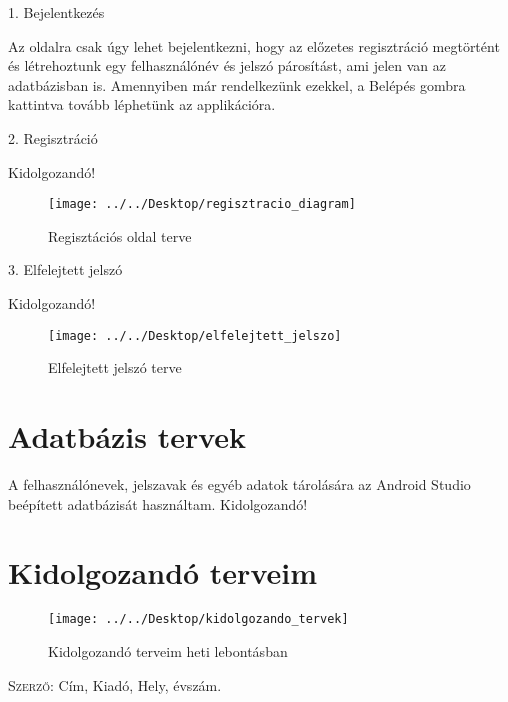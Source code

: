 \documentclass{thesis-ekf}
\begin{document}
	\begin{flushleft}
		1. Bejelentkezés
	\end{flushleft}

	Az oldalra csak úgy lehet bejelentkezni, hogy az előzetes regisztráció megtörtént és létrehoztunk egy felhasználónév és jelszó párosítást, ami jelen van az adatbázisban is. Amennyiben már rendelkezünk ezekkel, a Belépés gombra kattintva tovább léphetünk az applikációra.
	
	\begin{flushleft}
		2. Regisztráció
	\end{flushleft}
	Kidolgozandó!
	\begin{figure}[th!]
		\centering
		\texttt{[image: ../../Desktop/regisztracio\_diagram]}
		\caption{Regisztációs oldal terve}
		\label{abra-regisztraciodiagram}
	\end{figure}
	
	\newpage
	\begin{flushleft}
		3. Elfelejtett jelszó
	\end{flushleft}
	Kidolgozandó!
	\begin{figure}[th!]
		\centering
		\texttt{[image: ../../Desktop/elfelejtett\_jelszo]}
		\caption{Elfelejtett jelszó terve}
		\label{abra-elfelejtettjelszo}
	\end{figure}
	
	\newpage
	\section{Adatbázis tervek}
	A felhasználónevek, jelszavak és egyéb adatok tárolására az Android Studio beépített adatbázisát használtam.
	Kidolgozandó!
	
	\newpage
	\section{Kidolgozandó terveim}
	\begin{figure}[th!]
		\centering
		\texttt{[image: ../../Desktop/kidolgozando\_tervek]}
		\caption{Kidolgozandó terveim heti lebontásban}
		\label{abra-kidolgozandotervek}
	\end{figure}
	
	\begin{thebibliography}{1}
		 \textsc{Szerző}: Cím, Kiadó, Hely, évszám.
	\end{thebibliography}
\end{document}
